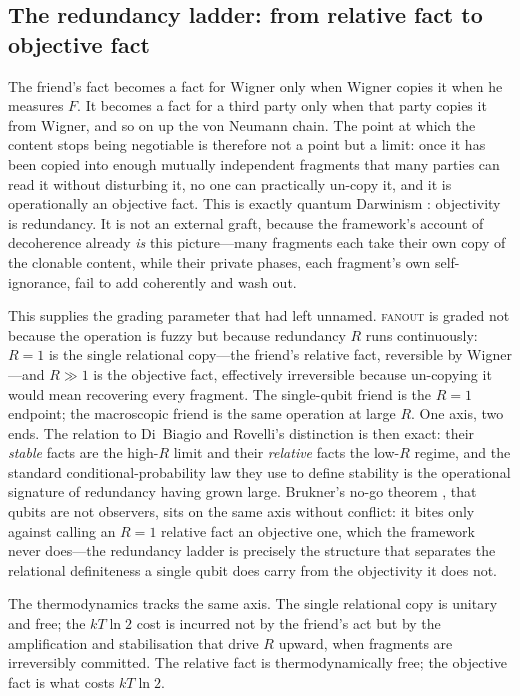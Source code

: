\subsection{The redundancy ladder: from relative fact to objective fact}
\label{sec:wf-redundancy}

The friend's fact becomes a fact for Wigner only when Wigner copies it when he
measures $F$. It becomes a fact for a third party only when that party copies it
from Wigner, and so on up the von Neumann chain. The point at which the content
stops being negotiable is therefore not a point but a limit: once it has been
copied into enough mutually independent fragments that many parties can read it
without disturbing it, no one can practically un-copy it, and it is operationally
an objective fact. This is exactly quantum Darwinism \autocite{zurek_2009}:
objectivity is redundancy. It is not an external graft, because the framework's
account of decoherence already \emph{is} this picture---many fragments each take
their own copy of the clonable content, while their private phases, each
fragment's own self-ignorance, fail to add coherently and wash out.

This supplies the grading parameter that  had left
unnamed. \textsc{fanout} is graded not because the operation is fuzzy but because
redundancy $R$ runs continuously: $R=1$ is the single relational copy---the
friend's relative fact, reversible by Wigner---and $R\gg 1$ is the objective
fact, effectively irreversible because un-copying it would mean recovering every
fragment. The single-qubit friend is the $R=1$ endpoint; the macroscopic friend
is the same operation at large $R$. One axis, two ends. The relation to
Di~Biagio and Rovelli's distinction \autocite{DiBiagioRovelli2021} is then exact:
their \emph{stable} facts are the high-$R$ limit and their \emph{relative} facts
the low-$R$ regime, and the standard conditional-probability law they use to
define stability is the operational signature of redundancy having grown large.
Brukner's no-go theorem \autocite{Brukner2021}, that qubits are not observers,
sits on the same axis without conflict: it bites only against calling an $R=1$
relative fact an objective one, which the framework never does---the redundancy
ladder is precisely the structure that separates the relational definiteness a
single qubit does carry from the objectivity it does not.

The thermodynamics tracks the same axis. The single relational copy is unitary and
free; the $kT\ln 2$ cost \autocite{Landauer_1961} is incurred not by the friend's
act but by the amplification and stabilisation that drive $R$ upward, when
fragments are irreversibly committed. The relative fact is thermodynamically free;
the objective fact is what costs $kT\ln 2$.


